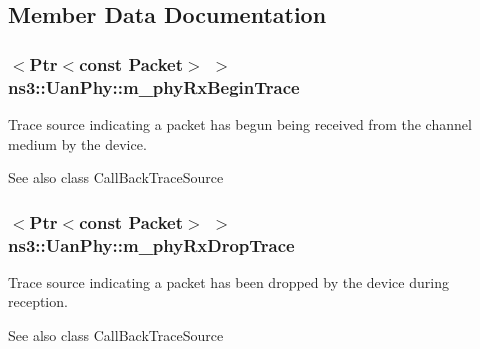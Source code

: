 \subsection{Member Data Documentation}
\subsubsection[{\texorpdfstring{m\+\_\+phy\+Rx\+Begin\+Trace}{m_phyRxBeginTrace}}]{$<${\bf Ptr}$<$const {\bf Packet}$>$ $>$ ns3\+::\+Uan\+Phy\+::m\+\_\+phy\+Rx\+Begin\+Trace\hspace{0.3cm}{\ttfamily [private]}}\hypertarget{classns3_1_1UanPhy_a44e0cd67ddc48a376c620472ec5b1484}{}\label{classns3_1_1UanPhy_a44e0cd67ddc48a376c620472ec5b1484}
Trace source indicating a packet has begun being received from the channel medium by the device.

\begin{DoxySeeAlso}{See also}
class Call\+Back\+Trace\+Source 
\end{DoxySeeAlso}
\subsubsection[{\texorpdfstring{m\+\_\+phy\+Rx\+Drop\+Trace}{m_phyRxDropTrace}}]{$<${\bf Ptr}$<$const {\bf Packet}$>$ $>$ ns3\+::\+Uan\+Phy\+::m\+\_\+phy\+Rx\+Drop\+Trace\hspace{0.3cm}{\ttfamily [private]}}\hypertarget{classns3_1_1UanPhy_a699b0b031b26c32c1a8df988ea20ec26}{}\label{classns3_1_1UanPhy_a699b0b031b26c32c1a8df988ea20ec26}
Trace source indicating a packet has been dropped by the device during reception.

\begin{DoxySeeAlso}{See also}
class Call\+Back\+Trace\+Source 
\end{DoxySeeAlso}
